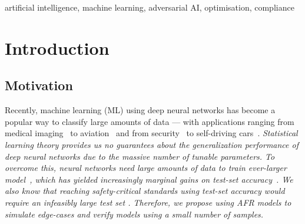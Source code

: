 \documentclass[conference]{IEEEtran}
\newcommand{\cm}[1]{\textit{{\color{blue}#1}}}
\begin{document}
\begin{IEEEkeywords}
artificial intelligence, machine learning, adversarial AI, optimisation, compliance
\end{IEEEkeywords}


\section{Introduction}
\subsection{Motivation}

Recently, machine learning (ML) using deep neural networks has become a popular way to classify large amounts of data --- with applications ranging from medical imaging~\cite{ai_medical_imaging} to aviation~\cite{ai_aviation} and from security~\cite{ai_security,ai_luggage,ai_prison} to self-driving cars~\cite{ai_automotive}. 
\cm{Statistical learning theory \cite{} provides us no guarantees about the generalization performance of deep neural networks due to the massive number of tunable parameters. To overcome this, neural networks need large amounts of data\cite{desislavov2021compute,bailly2022effects} to train ever-larger model~\cite{desislavov2021compute}, which has  yielded increasingly marginal gains on test-set accuracy~\cite{sun2017revisiting}. We also know that  reaching safety-critical standards using test-set accuracy would require an infeasibly large test set \cite{meyers}. Therefore, we propose using AFR models to simulate edge-cases and verify models using a small number of samples.}







 
\end{document}
